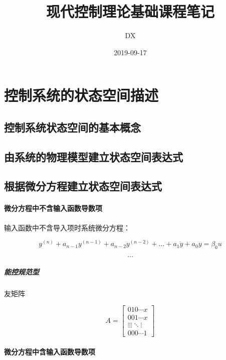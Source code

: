 \documentclass[11pt]{article}
\begin{document}
\title{现代控制理论基础课程笔记}
\author{DX}
\date{2019-09-17}
\maketitle

\section{控制系统的状态空间描述}   

\subsection{控制系统状态空间的基本概念}


\subsection{由系统的物理模型建立状态空间表达式}


\subsection{根据微分方程建立状态空间表达式}

\paragraph{微分方程中不含输入函数导数项}%
\label{par:微分方程中不含输入函数导数项}

输入函数中不含导入项时系统微分方程：

$$
y^{(n)} + a_{n-1}y^{(n-1)} + a_{n-2}y^{(n-2)} + \ldots + a_1 \dot y + a_0y = \beta_0u
$$

$$
\ldots
$$

\subparagraph{能控规范型}%
\label{par:能控规范型}

友矩阵

$$
A =
\left[
\begin{matrix}
0	1	0		\cdots	x \\
0	0	1		\cdots	x \\
\vdots	\vdots	\vdots	\ddots	\vdots \\
0	0	0	\cdots	1
\end{matrix}
\right]
$$

\paragraph{微分方程中含输入函数导数项}%
\label{par:微分方程中含输入函数导数项}
\end{document}
